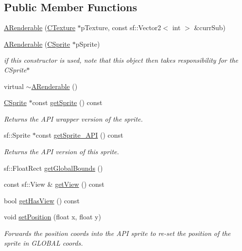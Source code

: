 \subsection*{Public Member Functions}
\begin{DoxyCompactItemize}
\item 
\hyperlink{classARenderable_a945fecfa1012fc94f186b8814f225ae8}{A\-Renderable} (\hyperlink{classCTexture}{C\-Texture} $\ast$p\-Texture, const sf\-::\-Vector2$<$ int $>$ \&curr\-Sub)
\item 
\hyperlink{classARenderable_a3d575592900ff1796452f35e7c618e6d}{A\-Renderable} (\hyperlink{classCSprite}{C\-Sprite} $\ast$p\-Sprite)
\begin{DoxyCompactList}\small\item\em if this constructor is used, note that this object then takes responsibility for the C\-Sprite$\ast$ \end{DoxyCompactList}\item 
virtual \hyperlink{classARenderable_a4242e972db0272afa33bbb60cb783132}{$\sim$\-A\-Renderable} ()
\item 
\hyperlink{classCSprite}{C\-Sprite} $\ast$const \hyperlink{classARenderable_a2fc0c24af527998d4d1a891ede342b8b}{get\-Sprite} () const 
\begin{DoxyCompactList}\small\item\em Returns the A\-P\-I wrapper version of the sprite. \end{DoxyCompactList}\item 
sf\-::\-Sprite $\ast$const \hyperlink{classARenderable_a87845b6d223c0f8907b465cdcf48311d}{get\-Sprite\-\_\-\-A\-P\-I} () const 
\begin{DoxyCompactList}\small\item\em Returns the A\-P\-I version of this sprite. \end{DoxyCompactList}\item 
sf\-::\-Float\-Rect \hyperlink{classARenderable_a77d3d8b9f8d7f0e8b860abba2f6c53c9}{get\-Global\-Bounds} ()
\item 
const sf\-::\-View \& \hyperlink{classARenderable_affb8b45bddba5083da20254577e32536}{get\-View} () const 
\item 
bool \hyperlink{classARenderable_a67b01539f9b4b960f0ad3a9a8c0bd5c1}{get\-Has\-View} () const 
\item 
void \hyperlink{classARenderable_a1d0db7e6ba2e9bf6d8accb4164531b46}{set\-Position} (float x, float y)
\begin{DoxyCompactList}\small\item\em Forwards the position coords into the A\-P\-I sprite to re-\/set the position of the sprite in G\-L\-O\-B\-A\-L coords. \end{DoxyCompactList}\end{DoxyCompactItemize}
